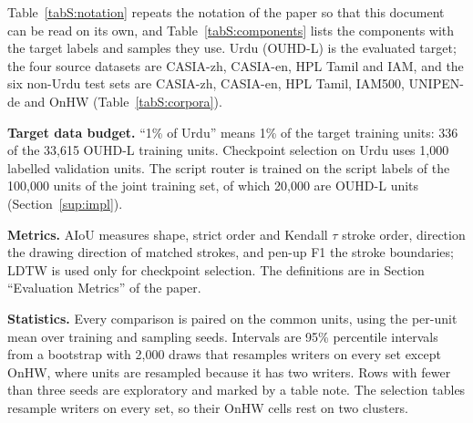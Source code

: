 \documentclass[10pt,a4paper]{article}
\begin{document}
Table~\ref{tabS:notation} repeats the notation of the paper so that this document can be read on its own, and Table~\ref{tabS:components} lists the components with the target labels and samples they use. Urdu (OUHD-L) is the evaluated target; the four source datasets are CASIA-zh, CASIA-en, HPL Tamil and IAM, and the six non-Urdu test sets are CASIA-zh, CASIA-en, HPL Tamil, IAM500, UNIPEN-de and OnHW (Table~\ref{tabS:corpora}).

\textbf{Target data budget.} ``1\% of Urdu'' means 1\% of the target training units: 336 of the 33,615 OUHD-L training units. Checkpoint selection on Urdu uses 1,000 labelled validation units. The script router is trained on the script labels of the 100,000 units of the joint training set, of which 20,000 are OUHD-L units (Section~\ref{sup:impl}).

\textbf{Metrics.} AIoU measures shape, strict order and Kendall $\tau$ stroke order, direction the drawing direction of matched strokes, and pen-up F1 the stroke boundaries; LDTW is used only for checkpoint selection. The definitions are in Section ``Evaluation Metrics'' of the paper.

\textbf{Statistics.} Every comparison is paired on the common units, using the per-unit mean over training and sampling seeds. Intervals are 95\% percentile intervals from a bootstrap with 2,000 draws that resamples writers on every set except OnHW, where units are resampled because it has two writers. Rows with fewer than three seeds are exploratory and marked by a table note. The selection tables resample writers on every set, so their OnHW cells rest on two clusters.
\end{document}
